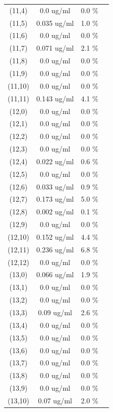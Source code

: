 \documentclass{article}
\begin{document}
\begin{tabular}{c c c c}
(11,4)&        0.0 ug/ml        &0.0 \%\\
(11,5)&        0.035 ug/ml        &1.0 \%\\
(11,6)&        0.0 ug/ml        &0.0 \%\\
(11,7)&        0.071 ug/ml        &2.1 \%\\
(11,8)&        0.0 ug/ml        &0.0 \%\\
(11,9)&        0.0 ug/ml        &0.0 \%\\
(11,10)&        0.0 ug/ml        &0.0 \%\\
(11,11)&        0.143 ug/ml        &4.1 \%\\
(12,0)&        0.0 ug/ml        &0.0 \%\\
(12,1)&        0.0 ug/ml        &0.0 \%\\
(12,2)&        0.0 ug/ml        &0.0 \%\\
(12,3)&        0.0 ug/ml        &0.0 \%\\
(12,4)&        0.022 ug/ml        &0.6 \%\\
(12,5)&        0.0 ug/ml        &0.0 \%\\
(12,6)&        0.033 ug/ml        &0.9 \%\\
(12,7)&        0.173 ug/ml        &5.0 \%\\
(12,8)&        0.002 ug/ml        &0.1 \%\\
(12,9)&        0.0 ug/ml        &0.0 \%\\
(12,10)&        0.152 ug/ml        &4.4 \%\\
(12,11)&        0.236 ug/ml        &6.8 \%\\
(12,12)&        0.0 ug/ml        &0.0 \%\\
(13,0)&        0.066 ug/ml        &1.9 \%\\
(13,1)&        0.0 ug/ml        &0.0 \%\\
(13,2)&        0.0 ug/ml        &0.0 \%\\
(13,3)&        0.09 ug/ml        &2.6 \%\\
(13,4)&        0.0 ug/ml        &0.0 \%\\
(13,5)&        0.0 ug/ml        &0.0 \%\\
(13,6)&        0.0 ug/ml        &0.0 \%\\
(13,7)&        0.0 ug/ml        &0.0 \%\\
(13,8)&        0.0 ug/ml        &0.0 \%\\
(13,9)&        0.0 ug/ml        &0.0 \%\\
(13,10)&        0.07 ug/ml        &2.0 \%\\

\end{tabular}
\end{document}
